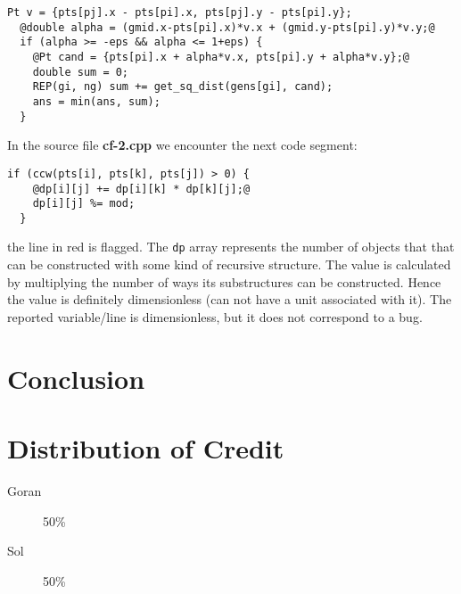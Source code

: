 \documentclass[12pt]{article}
\begin{document}
\begin{lstlisting}[label=proposal-full.cpp]
  Pt v = {pts[pj].x - pts[pi].x, pts[pj].y - pts[pi].y};
  @double alpha = (gmid.x-pts[pi].x)*v.x + (gmid.y-pts[pi].y)*v.y;@
  if (alpha >= -eps && alpha <= 1+eps) {
    @Pt cand = {pts[pi].x + alpha*v.x, pts[pi].y + alpha*v.y};@
    double sum = 0;
    REP(gi, ng) sum += get_sq_dist(gens[gi], cand);
    ans = min(ans, sum);
  }  
\end{lstlisting}

In the source file \textbf{cf-2.cpp} we encounter the next code segment:
\begin{lstlisting}[label=cf-2.cpp]
  if (ccw(pts[i], pts[k], pts[j]) > 0) {
    @dp[i][j] += dp[i][k] * dp[k][j];@
    dp[i][j] %= mod;
  }
\end{lstlisting}
the line in red is flagged.
The \texttt{dp} array represents the number of objects that that can be constructed with some kind of recursive structure.
The value is calculated by multiplying the number of ways its substructures can be constructed.
Hence the value is definitely dimensionless (can not have a unit associated with it).
The reported variable/line is dimensionless, but it does not correspond to a bug.

\section{Conclusion}

\section{Distribution of Credit}
\begin{description}
  \item[Goran] 50\%
    \item[Sol] 50\%
\end{description}



\end{document}

